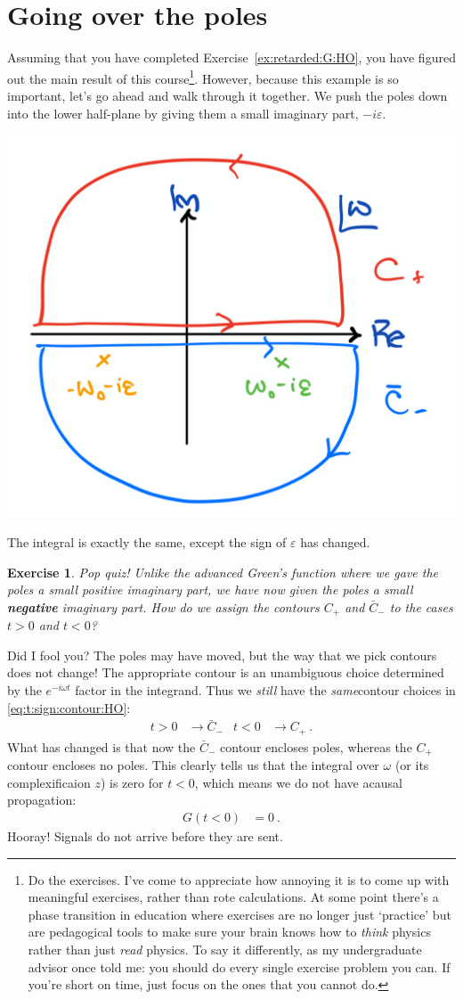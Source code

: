 \documentclass[
  11pt,
	colorful,
	raggedright,
]{tufte-style-thesis-flip}
\newtheorem{exercise}{Exercise}[section]
\begin{document}
\section{Going over the poles}

Assuming that you have completed Exercise~\ref{ex:retarded:G:HO}, you have figured out the main result of this course\footnote{Do the exercises. I've come to appreciate how annoying it is to come up with meaningful exercises, rather than rote calculations. At some point there's a phase transition in education where exercises are no longer just `practice' but are pedagogical tools to make sure your brain knows how to \emph{think} physics rather than just \emph{read} physics. To say it differently, as my undergraduate advisor once told me: you should do every single exercise problem you can. If you're short on time, just focus on the ones that you cannot do.}. However, because this example is so important, let's go ahead and walk through it together. We push the poles down into the lower half-plane by giving them a small imaginary part, $-i\varepsilon$.

\begin{center}
\includegraphics[width=.4\textwidth]{figures/Lec_2017_16_pokedown.pdf}
\end{center}

The integral is exactly the same, except the sign of $\varepsilon$ has changed. 
\begin{exercise}
Pop quiz! Unlike the advanced Green's function where we gave the poles a small positive imaginary part, we have now given the poles a small \textbf{negative} imaginary part. How do we assign the contours $C_+$ and $\bar C_-$ to the cases $t>0$ and $t<0$?
\end{exercise}
Did I fool you? The poles may have moved, but the way that we pick contours does not change! The appropriate contour is an unambiguous choice determined by the $e^{-i\omega t}$ factor in the integrand. Thus we \emph{still} have the \emph{same}contour choices in \eqref{eq:t:sign:contour:HO}:
\begin{align}
  t>0 &\to \bar C_{-} 
  &
  t<0 &\to C_+ \ .
\end{align}
What has changed is that now the $\bar C_{-}$ contour encloses poles, whereas the $C_+$ contour encloses no poles. This clearly tells us that the integral over $\omega$ (or its complexificaion $z$) is zero for $t<0$, which means we do not have acausal propagation: 
\begin{align}
  G(t<0) &= 0 \ .
  \label{eq:HO:G:ret:acausal}
\end{align}
Hooray! Signals do not arrive before they are sent.
\end{document}
